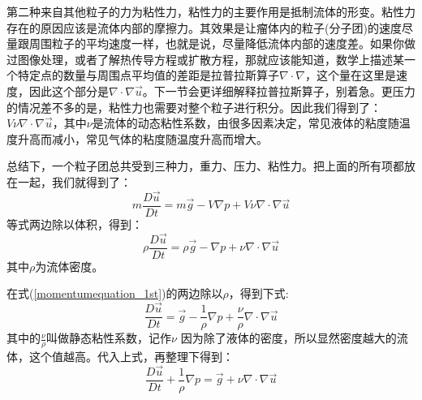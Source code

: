 \documentclass{article}
\begin{document}
第二种来自其他粒子的力为粘性力，粘性力的主要作用是抵制流体的形变。粘性力存在的原因应该是流体内部的摩擦力。其效果是让瘤体内的粒子(分子团)的速度尽量跟周围粒子的平均速度一样，也就是说，尽量降低流体内部的速度差。如果你做过图像处理，或者了解热传导方程或扩散方程，那就应该能知道，数学上描述某一个特定点的数量与周围点平均值的差距是拉普拉斯算子$\nabla\cdot\nabla$，这个量在这里是速度，因此这个部分是$\nabla\cdot\nabla\vec{u}$。下一节会更详细解释拉普拉斯算子，别着急。更压力的情况差不多的是，粘性力也需要对整个粒子进行积分。因此我们得到了：$V\nu\nabla\cdot\nabla\vec{u}$，其中$\nu$是流体的动态粘性系数，由很多因素决定，常见液体的粘度随温度升高而减小，常见气体的粘度随温度升高而增大。\par
总结下，一个粒子团总共受到三种力，重力、压力、粘性力。把上面的所有项都放在一起，我们就得到了：
\begin{equation}
m\frac{D\vec{u}}{Dt}=m\vec{g}-V\nabla{p}+V\nu\nabla\cdot\nabla\vec{u}
\end{equation}
等式两边除以体积，得到：
\begin{equation}
\rho\frac{D\vec{u}}{Dt}=\rho\vec{g}-\nabla{p}+\nu\nabla\cdot\nabla\vec{u} \label{momentumequation_1st}
\end{equation}
其中$\rho$为流体密度。


在式(\ref{momentumequation_1st})的两边除以$\rho$，得到下式:
\begin{equation}
\frac{D\vec{u}}{Dt}=\vec{g}-\frac{1}{\rho}\nabla{p}+\frac{\nu}{\rho}\nabla\cdot\nabla\vec{u}
\end{equation}
其中的$\frac{\nu}{\rho}$叫做静态粘性系数，记作$\nu$ 因为除了液体的密度，所以显然密度越大的流体，这个值越高。代入上式，再整理下得到：
\begin{equation}
\frac{D\vec{u}}{Dt}+\frac{1}{\rho}\nabla{p}=\vec{g}+\nu\nabla\cdot\nabla\vec{u}
\end{equation}
\end{document}
